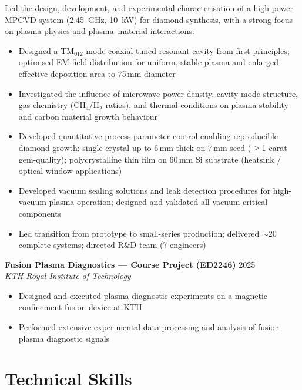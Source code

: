 \documentclass[a4paper,11pt]{article}
\begin{document}
\noindent Led the design, development, and experimental characterisation of a
high-power MPCVD system (2.45~GHz, 10~kW) for diamond synthesis, with a strong
focus on plasma physics and plasma--material interactions:

\begin{itemize}[noitemsep, topsep=2pt, leftmargin=*]
    \item Designed a TM$_{012}$-mode coaxial-tuned resonant cavity from first
          principles; optimised EM field distribution for uniform, stable plasma
          and enlarged effective deposition area to 75\,mm diameter
    \item Investigated the influence of microwave power density, cavity mode
          structure, gas chemistry (CH$_4$/H$_2$ ratios), and thermal conditions
          on plasma stability and carbon material growth behaviour
    \item Developed quantitative process parameter control enabling reproducible
          diamond growth: single-crystal up to 6\,mm thick on 7\,mm seed
          ($\geq$1 carat gem-quality); polycrystalline thin film on 60\,mm Si substrate
          (heatsink / optical window applications)
    \item Developed vacuum sealing solutions and leak detection procedures for
          high-vacuum plasma operation; designed and validated all vacuum-critical
          components
    \item Led transition from prototype to small-series production; delivered
          $\sim$20 complete systems; directed R\&D team (7 engineers)
\end{itemize}

\medskip
\noindent\textbf{Fusion Plasma Diagnostics --- Course Project (ED2246)} \hfill 2025 \\
\textit{KTH Royal Institute of Technology}
\begin{itemize}[noitemsep, topsep=2pt, leftmargin=*]
    \item Designed and executed plasma diagnostic experiments on a magnetic
          confinement fusion device at KTH
    \item Performed extensive experimental data processing and analysis of
          fusion plasma diagnostic signals
\end{itemize}

\section*{Technical Skills}
\end{document}
